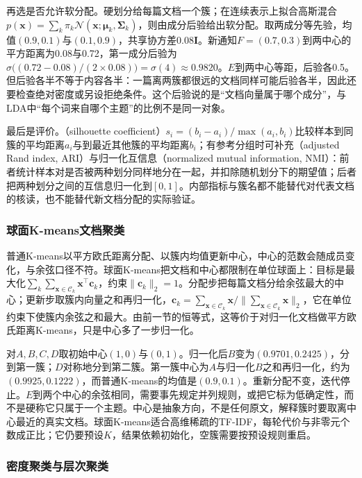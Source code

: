 再选是否允许软分配。硬划分给每篇文档一个簇；在连续表示上拟合高斯混合$p(\bm x)=\sum_k\pi_k\mathcal N(\bm x;\bm\mu_k,\bm\Sigma_k)$，则由成分后验给出软分配。取两成分等先验，均值$(0.9,0.1)$与$(0.1,0.9)$，共享协方差$0.08\bm I$。新通知$F=(0.7,0.3)$到两中心的平方距离为0.08与0.72，第一成分后验为$\sigma\bigl((0.72-0.08)/(2\times0.08)\bigr)=\sigma(4)\approx0.9820$。$E$到两中心等距，后验各0.5。但后验各半不等于内容各半：一篇离两簇都很远的文档同样可能后验各半，因此还要检查绝对密度或另设拒绝条件。这个后验说的是“文档向量属于哪个成分”，与LDA中“每个词来自哪个主题”的比例不是同一对象。

最后是评价。（silhouette coefficient）$s_i=(b_i-a_i)/\max(a_i,b_i)$比较样本到同簇的平均距离$a_i$与到最近其他簇的平均距离$b_i$；有参考分组时可补充（adjusted Rand index, ARI）与归一化互信息（normalized mutual information, NMI）：前者统计样本对是否被两种划分同样地分在一起，并扣除随机划分下的期望值；后者把两种划分之间的互信息归一化到$[0,1]$。内部指标与簇名都不能替代对代表文档的核读，也不能替代新文档分配的实际验证。

\subsubsection{球面K-means文档聚类}
\label{sec:nlp-classification-kmeans}

普通K-means以平方欧氏距离分配、以簇内均值更新中心，中心的范数会随成员变化，与余弦口径不符。球面K-means把文档和中心都限制在单位球面上\cite{nlp-organization-dhillon2001concept}：目标是最大化$\sum_k\sum_{\bm x\in\mathcal C_k}\bm x^\top\bm c_k$，约束$\|\bm c_k\|_2=1$。分配步把每篇文档分给余弦最大的中心；更新步取簇内向量之和再归一化，$\bm c_k=\sum_{\bm x\in\mathcal C_k}\bm x/\|\sum_{\bm x\in\mathcal C_k}\bm x\|_2$，它在单位约束下使簇内余弦之和最大。由前一节的恒等式，这等价于对归一化文档做平方欧氏距离K-means，只是中心多了一步归一化。

对$A,B,C,D$取初始中心$(1,0)$与$(0,1)$。归一化后$B$变为$(0.9701,0.2425)$，分到第一簇；$D$对称地分到第二簇。第一簇中心为$A$与归一化$B$之和再归一化，约为$(0.9925,0.1222)$，而普通K-means的均值是$(0.9,0.1)$。重新分配不变，迭代停止。$E$到两个中心的余弦相同，需要事先规定并列规则，或把它标为低确定性，而不是硬称它只属于一个主题。中心是抽象方向，不是任何原文，解释簇时要取离中心最近的真实文档。球面K-means适合高维稀疏的TF-IDF，每轮代价与非零元个数成正比；它仍要预设$K$，结果依赖初始化，空簇需要按预设规则重启。

\subsubsection{密度聚类与层次聚类}
\label{sec:nlp-classification-density}


